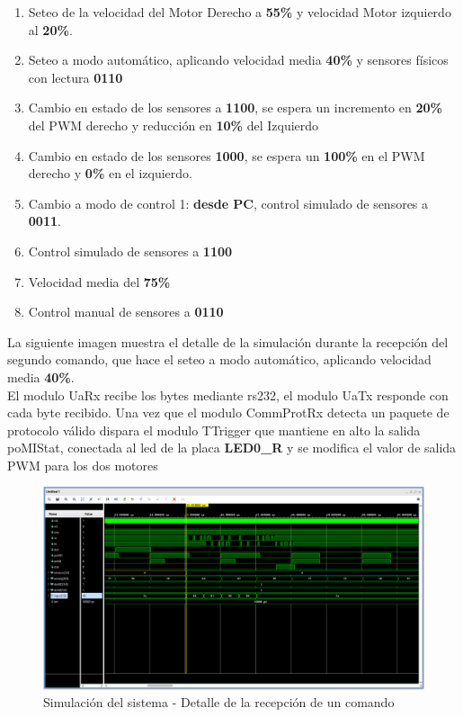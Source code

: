 \documentclass[12pt]{article}
\begin{document}
\begin{enumerate}
\footnotesize
\item Seteo de la velocidad del Motor Derecho a \textbf{55\%} y velocidad Motor izquierdo al \textbf{20\%}.
\item Seteo a modo automático, aplicando velocidad media \textbf{40\%} y sensores físicos con lectura \textbf{0110}
\item Cambio en estado de los sensores a \textbf{1100}, se espera un incremento en \textbf{20\%} del PWM derecho y reducción en \textbf{10\%} del Izquierdo 
\item Cambio en estado de los sensores \textbf{1000}, se espera un \textbf{100\%} en el PWM derecho y \textbf{0\%} en el izquierdo.
\item Cambio a modo de control 1: \textbf{desde PC}, control simulado de sensores a \textbf{0011}.
\item Control simulado de sensores a \textbf{1100}
\item Velocidad media del \textbf{75\%}
\item Control manual de sensores a \textbf{0110}
\end{enumerate}

La siguiente imagen muestra el detalle de la simulación durante la recepción del segundo comando, que hace el seteo a modo automático, aplicando velocidad media \textbf{40\%}.
\\

El modulo UaRx recibe los bytes mediante rs232, el modulo UaTx responde con cada byte recibido. Una vez que el modulo CommProtRx detecta un paquete de protocolo válido dispara el modulo TTrigger que mantiene en alto la salida poMIStat, conectada al led de la placa \textbf{LED0\_R} y se modifica el valor de salida PWM para los dos motores

\begin{figure}[H]
    \centering
    \includegraphics[width=\textwidth]{sim-cmd}
    \caption{Simulación del sistema - Detalle de la recepción de un comando}
\end{figure}
\end{document}
